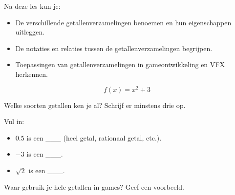 \documentclass{ximera}
\begin{document}
\begin{template}
    Na deze les kun je:
        \begin{itemize}
            \item De verschillende getallenverzamelingen benoemen en hun eigenschappen uitleggen.
            \item De notaties en relaties tussen de getallenverzamelingen begrijpen.
            \item Toepassingen van getallenverzamelingen in gameontwikkeling en VFX herkennen.
        \end{itemize}
    \end{template}

\begin{exercise}
    \[f(x)=x^2+3\]
\end{exercise}





\begin{exercise}
\begin{question}
Welke soorten getallen ken je al? Schrijf er minstens drie op.
\end{question}
\begin{question}
Vul in:
\begin{itemize}
    \item \( 0.5 \) is een \_\_\_ (heel getal, rationaal getal, etc.).
    \item \( -3 \) is een \_\_\_.
    \item \( \sqrt{2} \) is een \_\_\_.
\end{itemize}
\end{question}
\begin{question}
Waar gebruik je hele getallen in games? Geef een voorbeeld.
\end{question}
\end{exercise}

\end{document}

